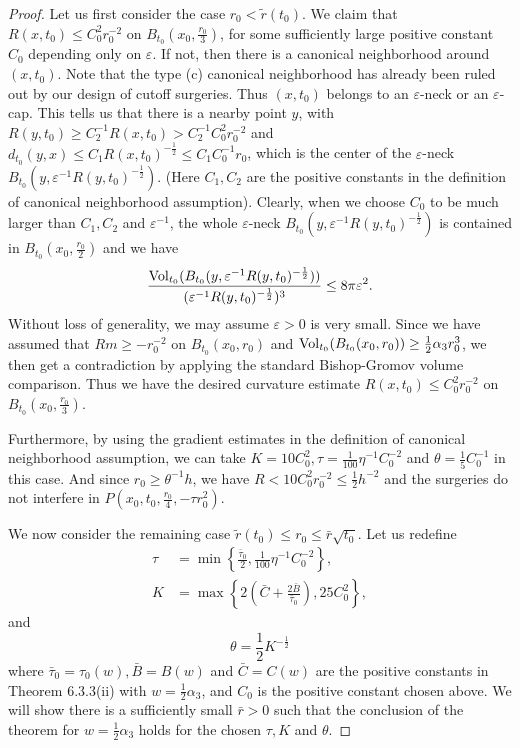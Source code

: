\begin{proof}
Let us first consider the case $r_0 < \widetilde{r}(t_0)$. We
claim that $R(x,t_0)\leq C^2_0r^{-2}_0$ on
$B_{t_0}(x_0,\frac{r_0}{3})$, for some sufficiently large positive
constant $C_0$ depending only on $\varepsilon$. If not, then there
is a canonical neighborhood around $(x,t_0)$. Note that the type
(c) canonical neighborhood has already been ruled out by our
design of cutoff surgeries. Thus $(x,t_0)$ belongs to an
$\varepsilon$-neck or an $\varepsilon$-cap. This tells us that
there is a nearby point $y$, with $R(y,t_0)\geq C^{-1}_2R(x,t_0) >
C^{-1}_2C^2_0r^{-2}_0$ and $d_{t_0}(y,x)\leq
C_1R(x,t_0)^{-\frac{1}{2}}\leq C_1C^{-1}_0r_0$, which is the
center of the $\varepsilon$-neck
$B_{t_0}(y,\varepsilon^{-1}R(y,t_0)^{-\frac{1}{2}})$. (Here
$C_1,C_2$ are the positive constants in the definition of
canonical neighborhood assumption). Clearly, when we choose $C_0$
to be much larger than $C_1,C_2$ and $\varepsilon^{-1}$, the whole
$\varepsilon$-neck
$B_{t_0}(y,\varepsilon^{-1}R(y,t_0)^{-\frac{1}{2}})$ is contained
in $B_{t_0}(x_0,\frac{r_0}{2})$ and we have \begin{equation}
\frac{\Vol_{t_0}(B_{t_0}(y,\varepsilon^{-1}
R(y,t_0)^{-\frac{1}{2}}))}{(\varepsilon^{-1}
R(y,t_0)^{-\frac{1}{2}})^3}\leq
8\pi\varepsilon^2. %
\end{equation} Without loss of generality, we may assume $\varepsilon>0$ is
very small. Since we have assumed that $Rm\geq -r^{-2}_0$ on
$B_{t_0}(x_0,r_0)$ and $\operatorname{Vol}_{t_0}(B_{t_0}(x_0,r_0))\geq
\frac{1}{2}\alpha_3r^3_0$, we then get a contradiction by applying
the standard Bishop-Gromov volume comparison. Thus we have the
desired curvature estimate $R(x,t_0)\leq C^2_0r^{-2}_0$ on
$B_{t_0}(x_0,\frac{r_0}{3})$.

Furthermore, by using the gradient estimates in the definition of
canonical neighborhood assumption, we can take
$K=10C^2_0,\tau=\frac{1}{100}\eta^{-1}C^{-2}_0$ and
$\theta=\frac{1}{5}C^{-1}_0$ in this case. And since
$r_0\geq\theta^{-1}h$, we have $R<10C^2_0r^{-2}_0\leq
\frac{1}{2}h^{-2}$ and the surgeries do not interfere in
$P(x_0,t_0,\frac{r_0}{4},-\tau r^2_0)$.

We now consider the remaining case $\widetilde{r}(t_0)\leq r_0\leq
\bar{r}\sqrt{t_0}$. Let us redefine
\begin{align*}
\tau&=\min\left\{\frac{\bar{\tau}_0}{2},\frac{1}{100}
\eta^{-1}C^{-2}_0 \right\},\\
K&=\max\left\{2\left(\bar{C}+\frac{2\bar{B}}{\bar{\tau}_0}\right),25C^2_0\right\},
\end{align*}
and
$$
\theta=\frac{1}{2}K^{-\frac{1}{2}}
$$
where $\bar{\tau}_0=\tau_0(w),\bar{B}=B(w)$ and $\bar{C}=C(w)$ are
the positive constants in Theorem 6.3.3(ii) with
$w=\frac{1}{2}\alpha_3$, and $C_0$ is the positive constant chosen
above. We will show there is a sufficiently small $\bar{r}>0$ such
that the conclusion of the theorem for $w=\frac{1}{2}\alpha_3$
holds for the chosen $\tau,K$ and $\theta$.


\end{proof}
